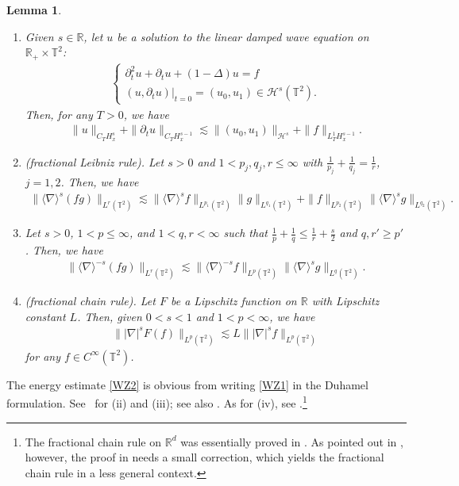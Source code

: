 \documentclass[letterpaper, 11pt,  reqno]{amsart}
\newtheorem{lemma}[theorem]{Lemma}
\theoremstyle{myremark}
\newcommand{\1}{\hspace{0.5mm}\text{I}\hspace{0.5mm}}
\newcommand{\R}{\mathbb{R}}
\newcommand{\T}{\mathbb{T}}
\newcommand{\nb}{\nabla}
\newcommand{\Dl}{\Delta}
\newcommand{\dt}{\partial_t}
\newcommand{\les}{\lesssim}
\newcommand{\jb}[1]
{\langle #1 \rangle}
\renewcommand{\H}{\mathcal{H}}
\numberwithin{equation}{section}
\numberwithin{theorem}{section}
\begin{document}
\begin{lemma}\label{LEM:toolbox}
\begin{enumerate}
\item Given $s \in \R$, 
let $u$ be a solution to  the linear damped wave equation on $\R_+ \times \T^2$\textup{:}
\begin{align}
\begin{cases}
\dt^2 u +\dt u + (1-\Dl) u  = f\\
(u,\dt u)|_{t=0}=(u_0,u_1) \in \H^s(\T^2).
\end{cases}
\label{WZ1}
\end{align}
Then,  
for any $T > 0$, 
we have
\begin{align}
\|u\|_{C_TH^{s}_x} + \|\dt u\|_{C_TH^{s-1}_x} 
 \les \|(u_0,u_1)\|_{\H^s} + \|f\|_{L^1_TH^{s-1}_x}.
\label{WZ2}
\end{align}



\item\textup{(fractional Leibniz rule).}
Let $s> 0$ and 
 $1<p_j,q_j,r\le \infty$ with $\frac1{p_j}+\frac1{q_j}=\frac1r$, $j=1,2$. Then, we have 
\begin{align*}
\big\|\jb{\nabla}^s(fg)\big\|_{L^r(\T^2)} 
\les \big\|\jb{\nabla}^s f\big\|_{L^{p_1}(\T^2)}\|g\|_{L^{q_1}(\T^2)} 
+ \|f\|_{L^{p_2}(\T^2)}\big\|\jb{\nabla}^s g\big\|_{L^{q_2}(\T^2)}.
\end{align*}


\item
Let $s > 0$, $1 < p \le \infty$, and 
 $1<q,r<\infty$ such that $\frac1p+\frac1q\le \frac1r + \frac{s}2$
 and $q, r' \ge p'$. Then, we have
\begin{align*}
\big\|\jb{\nabla}^{-s}(fg)\big\|_{L^r(\T^2)} \les \big\|\jb{\nabla}^{-s}f\big\|_{L^p(\T^2)}
\big\|\jb{\nabla}^s g\big\|_{L^q(\T^2)}.
\end{align*}




\item \textup{(fractional chain rule).}
Let $F$ be a Lipschitz function on $\R$ with Lipschitz constant $L$. Then, given $0 < s <1$ and $1 < p < \infty$, we have
\begin{align*} 
\big\| |\nb|^s F(f) \big\|_{L^p (\T^2)} \les L  \big\| |\nb|^s f \big\|_{L^p (\T^2)}
\end{align*}
for any $f \in C^\infty(\T^2)$.
\end{enumerate}
\end{lemma}


The energy estimate \eqref{WZ2} is obvious from 
writing \eqref{WZ1} in the Duhamel formulation.
See~\cite{BOZ} for (ii) and (iii);
see also \cite{GKO}.
As for (iv), see \cite{Gatto}.\footnote{The fractional chain rule on $\R^d$ was essentially proved in \cite{CW}. As pointed out in \cite{Staffilani}, however, 
the proof in \cite{CW} needs
a small correction, which  yields the fractional chain  rule in a 
less general context.}
\end{document}
